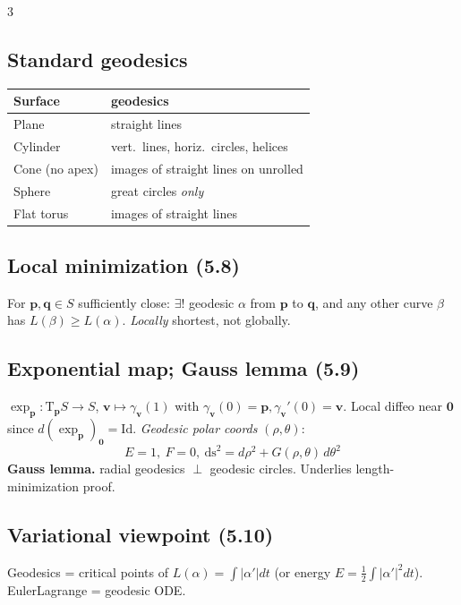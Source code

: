 \documentclass[9pt,a4paper]{extarticle}
\newcommand{\thm}[1]{\textbf{#1.}}
\newcommand{\T}{\mathrm{T}}
\newcommand{\bp}{\mathbf{p}}
\newcommand{\bq}{\mathbf{q}}
\newcommand{\bv}{\mathbf{v}}
\newcommand{\half}{\tfrac{1}{2}}
\begin{document}
\begin{multicols*}{3}
\subsection{Standard geodesics}
\begin{tabular}{@{}ll@{}}
\toprule
Surface & geodesics\\
\midrule
Plane & straight lines\\
Cylinder & vert.\ lines, horiz.\ circles, helices\\
Cone (no apex) & images of straight lines on unrolled\\
Sphere & great circles \emph{only}\\
Flat torus & images of straight lines\\
\bottomrule
\end{tabular}

\subsection{Local minimization (5.8)}
For $\bp,\bq\in S$ sufficiently close: $\exists !$ geodesic $\alpha$ from $\bp$ to $\bq$, and any other curve $\beta$ has $L(\beta)\ge L(\alpha)$. \emph{Locally} shortest, not globally.

\subsection{Exponential map; Gauss lemma (5.9)}
$\exp_\bp\!:\!\T_\bp S\!\to\!S$, $\bv\!\mapsto\!\gamma_\bv(1)$ with $\gamma_\bv(0)\!=\!\bp,\gamma_\bv'(0)\!=\!\bv$. Local diffeo near $\mathbf{0}$ since $d(\exp_\bp)_{\mathbf{0}}\!=\!\mathrm{Id}$. \emph{Geodesic polar coords} $(\rho,\theta)$:
\[
\boxed{\,E=1,\ F=0,\ \mathrm{ds}^2=d\rho^2+G(\rho,\theta)\,d\theta^2\,}
\]
\thm{Gauss lemma} radial geodesics $\perp$ geodesic circles. Underlies length-minimization proof.

\subsection{Variational viewpoint (5.10)}
Geodesics = critical points of $L(\alpha)=\int|\alpha'|dt$ (or energy $E=\half\int|\alpha'|^2dt$). Euler\textendash Lagrange = geodesic ODE.




\end{multicols*}
\end{document}
